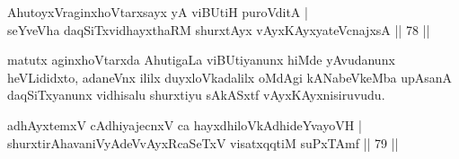 
\begin{shl}
AhutoyxVraginxhoVtarxsayx yA viBUtiH puroVditA | \\
seYveVha daqSiTxvidhayxthaRM shurxtAyx vAyxKAyxyateV\s cnajxsA \hfill|| 78 || 
\end{shl}

\begin{artha}
matutx aginxhoVtarxda AhutigaLa viBUtiyanunx hiMde yAvudanunx heVLididxto, adaneVnx ililx duyxloVkadalilx oMdAgi kANabeVkeMba upAsanA daqSiTxyanunx vidhisalu shurxtiyu sAkASxtf vAyxKAyxnisiruvudu.
\end{artha}

\begin{shl}
adhAyxtemxV cAdhiyajecnxV ca hayxdhiloVkAdhideYvayoVH | \\
shurxtirAhavaniVyAdeVvAyxRcaSeTxV visatxqqtiM suPxTAmf \hfill|| 79 || 
\end{shl}

